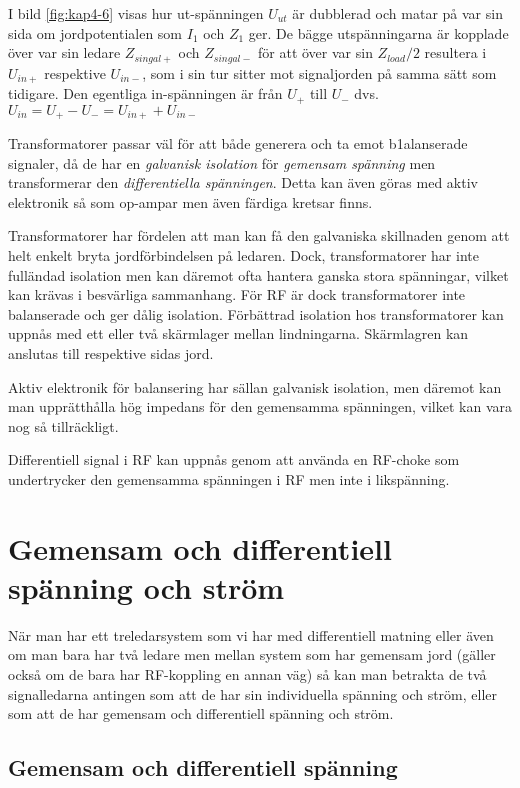 I bild \ref{fig:kap4-6} visas hur ut-spänningen \(U_{ut}\) är dubblerad och
matar på var sin sida om jordpotentialen som  \(I_{1}\) och \(Z_{1}\) ger.
De bägge utspänningarna är kopplade över var sin ledare \(Z_{singal+}\) och
\(Z_{singal-}\) för att över var sin \(Z_{load}/2\) resultera i \(U_{in+}\)
respektive \(U_{in-}\), som i sin tur sitter mot signaljorden på samma sätt
som tidigare.
Den egentliga in-spänningen är från \(U_{+}\) till \(U_{-}\) dvs.
\(U_{in} = U_{+} - U_{-} = U_{in+}+U_{in-}\)

Transformatorer passar väl för att både generera och ta emot b1alanserade
signaler, då de har en \emph{galvanisk isolation} för \emph{gemensam spänning}
men transformerar den \emph{differentiella spänningen}.
Detta kan även göras med aktiv elektronik så som op-ampar men även färdiga
kretsar finns.

Transformatorer har fördelen att man kan få den galvaniska skillnaden genom
att helt enkelt bryta jordförbindelsen på ledaren.
Dock, transformatorer har inte fulländad isolation men kan däremot ofta hantera
ganska stora spänningar, vilket kan krävas i besvärliga sammanhang.
För RF är dock transformatorer inte balanserade och ger dålig isolation.
Förbättrad isolation hos transformatorer kan uppnås med ett eller två
skärmlager mellan lindningarna.
Skärmlagren kan anslutas till respektive sidas jord.

Aktiv elektronik för balansering har sällan galvanisk isolation, men däremot
kan man upprätthålla hög impedans för den gemensamma spänningen, vilket kan
vara nog så tillräckligt.

Differentiell signal i RF kan uppnås genom att använda en RF-choke som
undertrycker den gemensamma spänningen i RF men inte i likspänning.

\section[Gemensam och diff]{Gemensam och differentiell spänning och ström}

När man har ett treledarsystem som vi har med differentiell matning eller
även om man bara har två ledare men mellan system som har gemensam jord
(gäller också om de bara har RF-koppling en annan väg) så kan man betrakta
de två signalledarna antingen som att de har sin individuella spänning och
ström, eller som att de har gemensam och differentiell spänning och ström.

\subsection{Gemensam och differentiell spänning}
\label{comdiffv}


